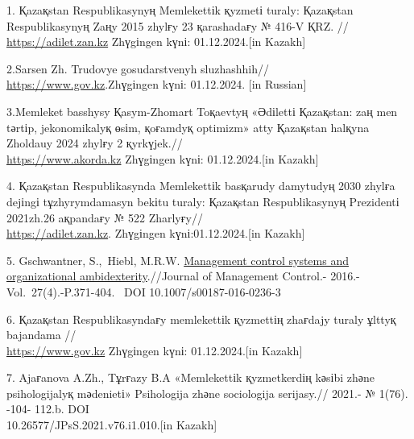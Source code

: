 \begin{references}
1. Қazaқstan Respublikasynyң Memlekettіk қyzmetі turaly: Қazaқstan
Respublikasynyң Zaңy 2015 zhylғy 23 қarashadaғy № 416-V ҚRZ. //
\href{https://adilet.zan.kz/kaz/docs/Z1500000416}{https://adilet.zan.kz} Zhүgіngen kүnі:
01.12.2024.{[}in Kazakh{]}

2.Sarsen Zh. Trudovye gosudarstvenyh
sluzhashhih// \href{https://www.gov.kz/memleket/entities/zem-shahtinsk/press/news/details/813166}{https://www.gov.kz}.Zhүgіngen kүnі: 01.12.2024.
{[}in Russian{]}

3.Memleket basshysy Қasym-Zhomart Toқaevtyң «Әdіlettі Қazaқstan: zaң men
tәrtіp, jekonomikalyқ өsіm, қoғamdyқ optimizm» atty Қazaқstan halқyna
Zholdauy 2024 zhylғy 2
қyrkүjek.// \\\href{https://www.akorda.kz/kz/memleket-basshysy-kasym-zhomart-tokaevtyn-adiletti-kazakstan-zan-men-tartip-ekonomikalyk-osim-kogamdyk-optimizm-atty-kazakstan-halkyna-zholdauy-285659}{https://www.akorda.kz}
Zhүgіngen kүnі: 01.12.2024.{[}in Kazakh{]}

4. Қazaқstan Respublikasynda Memlekettіk basқarudy damytudyң 2030 zhylғa
dejіngі tұzhyrymdamasyn bekіtu turaly: Қazaқstan Respublikasynyң
Prezidentі 2021zh.26 aқpandaғy № 522
Zharlyғy//\\\href{https://adilet.zan.kz/kaz/docs/U150000015}{https://adilet.zan.kz}. Zhүgіngen
kүnі:01.12.2024.{[}in Kazakh{]}

5. Gschwantner, S.,~Hiebl, M.R.W.
\href{https://www.scopus.com/record/display.uri?eid=2-s2.0-84978811157&origin=reflist&sort=plf-f&src=s&sid=9294c12779ee47479a1a0997e8991897&sot=b&sdt=b&sl=99&s=TITLE\%28An+Examination+of+Civil+Servants\%e2\%80\%99+Assessment+of++the+New+Civil+Service+Reforms+in+Kazakhstan\%29}{Management
control systems and organizational ambidexterity}.//Journal of
Management Control.- 2016.- Vol.~27(4).-P.371-404.~
DOI 10.1007/s00187-016-0236-3

6. Қazaқstan Respublikasyndaғy memlekettіk қyzmettің zhaғdajy turaly
ұlttyқ bajandama
// \\\href{https://www.gov.kz/memleket/entities/qyzmet/documents/details/454043?lang=kk}{https://www.gov.kz}
Zhүgіngen kүnі: 01.12.2024.{[}in Kazakh{]}

7. Ajaғanova A.Zh., Tұrғazy B.A «Memlekettіk қyzmetkerdің kәsіbi zhәne
psihologijalyқ mәdenietі» Psihologija zhәne sociologija serijasy.//
2021.- № 1(76). -104- 112.b.
DOI \\10.26577/JPsS.2021.v76.i1.010.{[}in Kazakh{]}


\end{references}
